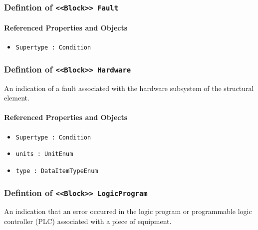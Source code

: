 \subsubsection{Defintion of \texttt{<<Block>> Fault}}
  \label{type:Fault}

\FloatBarrier



\FloatBarrier
\paragraph{Referenced Properties and Objects}

\begin{itemize}
\item \texttt{Supertype : Condition}

\end{itemize}
\FloatBarrier
\subsubsection{Defintion of \texttt{<<Block>> Hardware}}
  \label{type:Hardware}

\FloatBarrier

An indication of a fault associated with the hardware subsystem of the structural element.

\FloatBarrier
\paragraph{Referenced Properties and Objects}

\begin{itemize}
\item \texttt{Supertype : Condition}

\item \texttt{units : UnitEnum}

\item \texttt{type : DataItemTypeEnum}

\end{itemize}
\FloatBarrier
\subsubsection{Defintion of \texttt{<<Block>> LogicProgram}}
  \label{type:LogicProgram}

\FloatBarrier

An indication that an error occurred in the logic program or programmable logic controller (PLC) associated with a piece of equipment.

